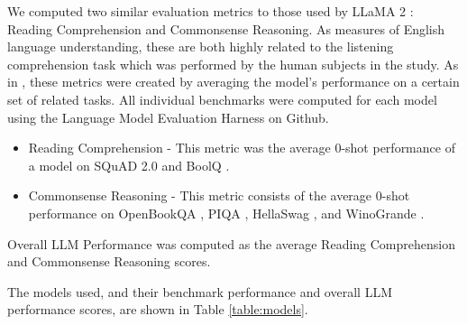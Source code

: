 We computed two similar evaluation metrics to those used by LLaMA 2 \cite{touvron2023llama2}: Reading Comprehension and Commonsense Reasoning. As measures of English language understanding, these are both highly related to the listening comprehension task which was performed by the human subjects in the study. As in \cite{touvron2023llama2}, these metrics were created by averaging the model's performance on a certain set of related tasks. All individual benchmarks were computed for each model using the Language Model Evaluation Harness \cite{evalharness} on Github.

\begin{itemize}
  \item Reading Comprehension - This metric was the average 0-shot performance of a model on SQuAD 2.0 \cite{rajpurkar2018know} and BoolQ \cite{clark2019boolq}.
  \item Commonsense Reasoning - This metric consists of the average 0-shot performance on OpenBookQA \cite{mihaylov2018can}, PIQA \cite{bisk2020piqa}, HellaSwag \cite{zellers2019hellaswag}, and WinoGrande \cite{sakaguchi2021winogrande}.
\end{itemize}

Overall LLM Performance was computed as the average Reading Comprehension and Commonsense Reasoning scores.

The models used, and their benchmark performance and overall LLM performance scores, are shown in Table \ref{table:models}.



